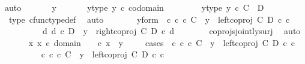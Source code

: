 \begin{isabellebody}
{\isacharparenleft}{\kern0pt}auto{\isacharparenright}{\kern0pt}\ \isanewline
\ \ \ \ \isamarkupfalse%
\ y\ \isanewline
\ \ \ \ \isamarkupfalse%
\ y{\isacharunderscore}{\kern0pt}type{\isacharcolon}{\kern0pt}\ {\isachardoublequoteopen}y\ {\isasymin}\isactrlsub c\ codomain\ {\isasymphi}{\isachardoublequoteclose}\isanewline
\ \ \ \ \isamarkupfalse%
\ \isamarkupfalse%
\ y{\isacharunderscore}{\kern0pt}type{}{\isacharcolon}{\kern0pt}\ {\isachardoublequoteopen}y\ {\isasymin}\isactrlsub c\ C\ {\isasymCoprod}\ D{\isachardoublequoteclose}\isanewline
\ \ \ \ \ \ \isamarkupfalse%
\ {\isasymphi}{\isacharunderscore}{\kern0pt}type\ cfunc{\isacharunderscore}{\kern0pt}type{\isacharunderscore}{\kern0pt}def\ \isamarkupfalse%
\ auto\isanewline
\ \ \ \ \isamarkupfalse%
\ \isamarkupfalse%
\ y{\isacharunderscore}{\kern0pt}form{\isacharcolon}{\kern0pt}\ {\isachardoublequoteopen}{\isacharparenleft}{\kern0pt}{\isasymexists}\ c{\isachardot}{\kern0pt}\ c\ {\isasymin}\isactrlsub c\ C\ {\isasymand}\ y\ {\isacharequal}{\kern0pt}\ left{\isacharunderscore}{\kern0pt}coproj\ C\ D\ {\isasymcirc}\isactrlsub c\ c{\isacharparenright}{\kern0pt}\isanewline
\ \ \ \ \ \ {\isasymor}\ \ {\isacharparenleft}{\kern0pt}{\isasymexists}\ d{\isachardot}{\kern0pt}\ d\ {\isasymin}\isactrlsub c\ D\ {\isasymand}\ y\ {\isacharequal}{\kern0pt}\ right{\isacharunderscore}{\kern0pt}coproj\ C\ D\ {\isasymcirc}\isactrlsub c\ d{\isacharparenright}{\kern0pt}{\isachardoublequoteclose}\isanewline
\ \ \ \ \ \ \isamarkupfalse%
\ coprojs{\isacharunderscore}{\kern0pt}jointly{\isacharunderscore}{\kern0pt}surj\ \isamarkupfalse%
\ auto\isanewline
\ \ \ \ \isamarkupfalse%
\ {\isachardoublequoteopen}{\isasymexists}x{\isachardot}{\kern0pt}\ x\ {\isasymin}\isactrlsub c\ domain\ {\isasymphi}\ {\isasymand}\ {\isasymphi}\ {\isasymcirc}\isactrlsub c\ x\ {\isacharequal}{\kern0pt}\ y{\isachardoublequoteclose}\isanewline
\ \ \ \ \isamarkupfalse%
{\isacharparenleft}{\kern0pt}cases\ {\isachardoublequoteopen}{\isasymexists}\ c{\isachardot}{\kern0pt}\ c\ {\isasymin}\isactrlsub c\ C\ {\isasymand}\ y\ {\isacharequal}{\kern0pt}\ left{\isacharunderscore}{\kern0pt}coproj\ C\ D\ {\isasymcirc}\isactrlsub c\ c{\isachardoublequoteclose}{\isacharparenright}{\kern0pt}\isanewline
\ \ \ \ \ \ \isamarkupfalse%
\ {\isachardoublequoteopen}{\isasymexists}\ c{\isachardot}{\kern0pt}\ c\ {\isasymin}\isactrlsub c\ C\ {\isasymand}\ y\ {\isacharequal}{\kern0pt}\ left{\isacharunderscore}{\kern0pt}coproj\ C\ D\ {\isasymcirc}\isactrlsub c\ c{\isachardoublequoteclose}\isanewline

\end{isabellebody}
